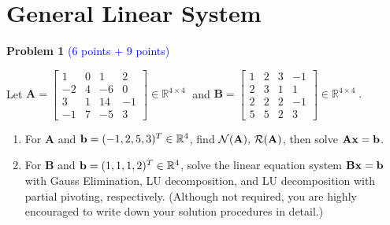\documentclass[english,onecolumn]{IEEEtran}
\begin{document}
\section{General Linear System}
\noindent\textbf{Problem 1}   \textcolor{blue}{(6 points + 9 points)}
\vspace*{3mm}

\noindent Let $\mathbf{A} = \begin{bmatrix}
	1 & 0 & 1 & 2\\
	-2 & 4 & -6 & 0\\
	3 & 1 & 14 & -1\\
	-1 & 7 & -5 & 3
	\end{bmatrix} \in\mathbb{R}^{4\times 4}\;$ and
	$\mathbf{B} = \begin{bmatrix}
	1 & 2 & 3 & -1\\
	2 & 3 & 1 & 1\\
	2 & 2 & 2 & -1\\
	5 & 5 & 2 & 3
	\end{bmatrix} \in\mathbb{R}^{4\times 4}\;.$
\begin{enumerate}
	\item 
	For {\bf A} and ${\bf b} = (-1,2,5,3)^T\in \mathbb{R}^4$, 
	find $\mathcal{N}({\bf A}),\, \mathcal{R}({\bf A})$, then solve ${\bf Ax} = {\bf b}$.
	\item 
	For {\bf B} and 
	${\bf b} = (1,1,1,2)^T \in \mathbb{R}^4$, solve the linear equation system ${\bf Bx} = {\bf b}$ 
	with Gauss Elimination, LU decomposition, and LU decomposition with partial pivoting, respectively. (Although not required, you are highly encouraged to write down your solution procedures in detail.)
\end{enumerate}
\end{document}
